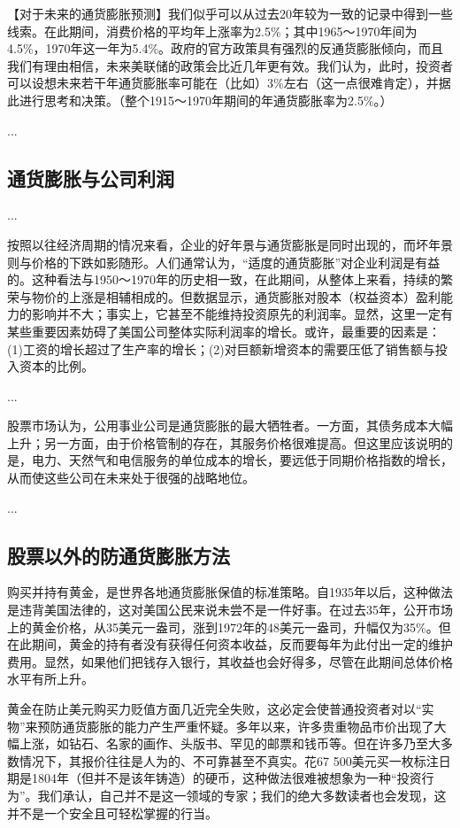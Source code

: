 \documentclass[12pt,oneside]{book}
\begin{document}
【对于未来的通货膨胀预测】我们似乎可以从过去20年较为一致的记录中得到一些线索。在此期间，消费价格的平均年上涨率为2.5\%；其中1965～1970年间为4.5\%，1970年这一年为5.4\%。政府的官方政策具有强烈的反通货膨胀倾向，而且我们有理由相信，未来美联储的政策会比近几年更有效。我们认为，此时，投资者可以设想未来若干年通货膨胀率可能在（比如）3\%左右（这一点很难肯定），并据此进行思考和决策。（整个1915～1970年期间的年通货膨胀率为2.5\%。）

...

\subsection{通货膨胀与公司利润}
...

按照以往经济周期的情况来看，企业的好年景与通货膨胀是同时出现的，而坏年景则与价格的下跌如影随形。人们通常认为，“适度的通货膨胀”对企业利润是有益的。这种看法与1950～1970年的历史相一致，在此期间，从整体上来看，持续的繁荣与物价的上涨是相辅相成的。但数据显示，通货膨胀对股本（权益资本）盈利能力的影响并不大；事实上，它甚至不能维持投资原先的利润率。显然，这里一定有某些重要因素妨碍了美国公司整体实际利润率的增长。或许，最重要的因素是：(1)工资的增长超过了生产率的增长；(2)对巨额新增资本的需要压低了销售额与投入资本的比例。

...

股票市场认为，公用事业公司是通货膨胀的最大牺牲者。一方面，其债务成本大幅上升；另一方面，由于价格管制的存在，其服务价格很难提高。但这里应该说明的是，电力、天然气和电信服务的单位成本的增长，要远低于同期价格指数的增长，从而使这些公司在未来处于很强的战略地位。

...

\subsection{股票以外的防通货膨胀方法}
购买并持有黄金，是世界各地通货膨胀保值的标准策略。自1935年以后，这种做法是违背美国法律的，这对美国公民来说未尝不是一件好事。在过去35年，公开市场上的黄金价格，从35美元一盎司，涨到1972年的48美元一盎司，升幅仅为35\%。但在此期间，黄金的持有者没有获得任何资本收益，反而要每年为此付出一定的维护费用。显然，如果他们把钱存入银行，其收益也会好得多，尽管在此期间总体价格水平有所上升。

黄金在防止美元购买力贬值方面几近完全失败，这必定会使普通投资者对以“实物”来预防通货膨胀的能力产生严重怀疑。多年以来，许多贵重物品市价出现了大幅上涨，如钻石、名家的画作、头版书、罕见的邮票和钱币等。但在许多乃至大多数情况下，其报价往往是人为的、不可靠甚至不真实。花67 500美元买一枚标注日期是1804年（但并不是该年铸造）的硬币，这种做法很难被想象为一种“投资行为”。我们承认，自己并不是这一领域的专家；我们的绝大多数读者也会发现，这并不是一个安全且可轻松掌握的行当。
\end{document}
